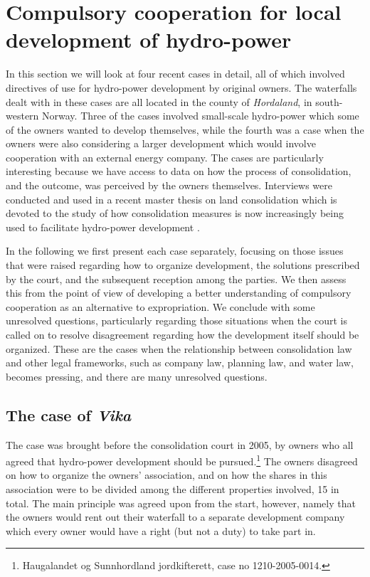 \documentclass[10pt]{article} %
\begin{document}
\section{Compulsory cooperation for local development of hydro-power}\label{sec:4}

In this section we will look at four recent cases in detail, all of which involved directives of use for hydro-power development by original owners. The waterfalls dealt with in these cases are all located in the county of \emph{Hordaland}, in south-western Norway. Three of the cases involved small-scale hydro-power which some of the owners wanted to develop themselves, while the fourth was a case when the owners were also considering a larger development which would involve cooperation with an external energy company. The cases are particularly interesting because we have access to data on how the process of consolidation, and the outcome, was perceived by the owners themselves. Interviews were conducted and used in a recent master thesis on land consolidation which is devoted to the study of how consolidation measures is now increasingly being used to facilitate hydro-power development \cite{master}.

In the following we first present each case separately, focusing on those issues that were raised regarding how to organize development, the solutions prescribed by the court, and the subsequent reception among the parties. We then assess this from the point of view of developing a better understanding of compulsory cooperation as an alternative to expropriation. We conclude with some unresolved questions, particularly regarding those situations when the court is called on to resolve disagreement regarding how the development itself should be organized. These are the cases when the relationship between consolidation law and other legal frameworks, such as company law, planning law, and water law, becomes pressing, and there are many unresolved questions.

\subsection{The case of \emph{Vika}}

The case was brought before the consolidation court in 2005, by owners who all agreed that hydro-power development should be pursued.\footnote{Haugalandet og Sunnhordland jordkifterett, case no 1210-2005-0014.} The owners disagreed on how to organize the owners' association, and on how the shares in this association were to be divided among the different properties involved, 15 in total. The main principle was agreed upon from the start, however, namely that the owners would rent out their waterfall to a separate development company which every owner would have a right (but not a duty) to take part in. 
\end{document}

